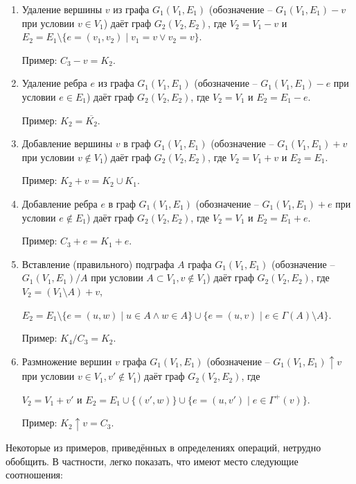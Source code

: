 \documentclass[
]{article}
\begin{document}
\begin{enumerate}
{{{{{\begin{enumerate}
    Пример: $K_{3,3} = C_3 + C_3$.
    
    \item Удаление вершины $v$ из графа $G_1(V_1, E_1)$ (обозначение -- $G_1(V_1, E_1) - v$ при условии $v \in V_1$) даёт граф $G_2(V_2, E_2)$, где $V_2 = V_1 - v$ и $E_2 = E_1 \setminus \{ e = (v_1, v_2) \mid v_1 = v \vee v_2 = v \}$.
    
    Пример: $C_3 - v = K_2$.
    
    \item Удаление ребра $e$ из графа $G_1(V_1, E_1)$ (обозначение -- $G_1(V_1, E_1) - e$ при условии $e \in E_1$) даёт граф $G_2(V_2, E_2)$, где $V_2 = V_1$ и $E_2 = E_1 - e$.
    
    Пример: $K_2 = \overline{K_2}$.
    
    \item Добавление вершины $v$ в граф $G_1(V_1, E_1)$ (обозначение -- $G_1(V_1, E_1) + v$ при условии $v \notin V_1$) даёт граф $G_2(V_2, E_2)$, где $V_2 = V_1 + v$ и $E_2 = E_1$.
    
    Пример: $K_2 + v = K_2 \cup K_1$.
    
    \item Добавление ребра $e$ в граф $G_1(V_1, E_1)$ (обозначение -- $G_1(V_1, E_1) + e$ при условии $e \notin E_1$) даёт граф $G_2(V_2, E_2)$, где $V_2 = V_1$ и $E_2 = E_1 + e$.
    
    Пример: $C_3 + e = K_1 + e$.
    
    \item Вставление (правильного) подграфа $A$ графа $G_1(V_1, E_1)$ (обозначение -- $G_1(V_1, E_1) / A$ при условии $A \subset V_1, v \notin V_1$) даёт граф $G_2(V_2, E_2)$, где $V_2 = (V_1 \setminus A) + v$,
    
    $E_2 = E_1 \setminus \{ e = (u, w) \mid u \in A \wedge w \in A \} \cup \{ e = (u, v) \mid e \in \Gamma(A) \setminus A \}$.
    
    Пример: $K_4 / C_3 = K_2$.
    
    \item Размножение вершин $v$ графа $G_1(V_1, E_1)$ (обозначение -- $G_1(V_1, E_1) \uparrow v$ при условии $v \in V_1, v' \notin V_1$) даёт граф $G_2(V_2, E_2)$, где
    
    $V_2 = V_1 + v'$ и $E_2 = E_1 \cup \{ (v', w) \} \cup \{ e = (u, v') \mid e \in \Gamma^+(v) \}$.
    
    Пример: $K_2 \uparrow v = C_3$.
\end{enumerate}

Некоторые из примеров, приведённых в определениях операций, нетрудно обобщить. В частности, легко показать, что имеют место следующие соотношения:

}}}}}
\end{enumerate}
\end{document}
